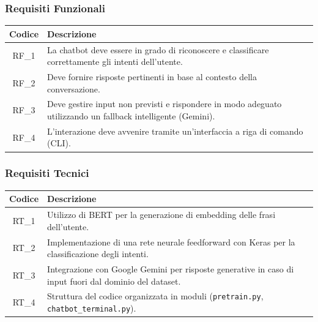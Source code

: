 \documentclass[12pt, letterpaper]{article}
\begin{document}
\subsubsection{Requisiti Funzionali}
\begin{table}[h]
\centering
\renewcommand{\arraystretch}{1.5} %
\begin{tabular}{|c|p{12cm}|}
\hline
\textbf{Codice} & \textbf{Descrizione} \\
\hline
RF\_1 & La chatbot deve essere in grado di riconoscere e classificare correttamente gli intenti dell’utente. \\
\hline
RF\_2 & Deve fornire risposte pertinenti in base al contesto della conversazione. \\
\hline
RF\_3 & Deve gestire input non previsti e rispondere in modo adeguato utilizzando un fallback intelligente (Gemini). \\
\hline
RF\_4 & L'interazione deve avvenire tramite un’interfaccia a riga di comando (CLI). \\
\hline
\end{tabular}
\label{tab:requisiti_funzionali}
\end{table}

\subsubsection{Requisiti Tecnici}
\begin{table}[h]
\centering
\renewcommand{\arraystretch}{1.5} %
\begin{tabular}{|c|p{12cm}|}
\hline
\textbf{Codice} & \textbf{Descrizione} \\
\hline
RT\_1 & Utilizzo di BERT per la generazione di embedding delle frasi dell’utente. \\
\hline
RT\_2 & Implementazione di una rete neurale feedforward con Keras per la classificazione degli intenti. \\
\hline
RT\_3 & Integrazione con Google Gemini per risposte generative in caso di input fuori dal dominio del dataset. \\
\hline
RT\_4 & Struttura del codice organizzata in moduli (\texttt{pretrain.py}, \texttt{chatbot\_terminal.py}). \\
\hline
\end{tabular}
\label{tab:requisiti_tecnici}
\end{table}
\end{document}
